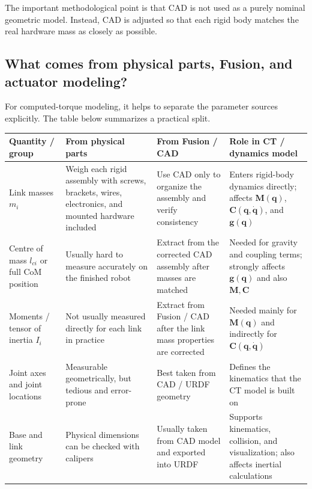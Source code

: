 \documentclass[11pt,a4paper]{article}
\newcommand{\bq}{\bm{q}}
\newcommand{\bM}{\bm{M}}
\newcommand{\bC}{\bm{C}}
\newcommand{\bG}{\bm{g}}
\begin{document}
The important methodological point is that CAD is not used as a purely nominal
geometric model.  Instead, CAD is adjusted so that each rigid body matches the
real hardware mass as closely as possible.

\subsection{What comes from physical parts, Fusion, and actuator modeling?}

For computed-torque modeling, it helps to separate the parameter sources
explicitly.  The table below summarizes a practical split.

\begin{table}[H]
\centering
\small
\begin{tabularx}{\linewidth}{p{3.0cm} p{3.2cm} p{3.2cm} X}
\toprule
\textbf{Quantity / group} & \textbf{From physical parts} & \textbf{From Fusion / CAD} & \textbf{Role in CT / dynamics model} \\
\midrule
Link masses $m_i$ & Weigh each rigid assembly with screws, brackets, wires, electronics, and mounted hardware included & Use CAD only to organize the assembly and verify consistency & Enters rigid-body dynamics directly; affects $\bM(\bq)$, $\bC(\bq,\dot{\bq})$, and $\bG(\bq)$ \\

Centre of mass $l_{ci}$ or full CoM position & Usually hard to measure accurately on the finished robot & Extract from the corrected CAD assembly after masses are matched & Needed for gravity and coupling terms; strongly affects $\bG(\bq)$ and also $\bM,\bC$ \\

Moments / tensor of inertia $I_i$ & Not usually measured directly for each link in practice & Extract from Fusion / CAD after the link mass properties are corrected & Needed mainly for $\bM(\bq)$ and indirectly for $\bC(\bq,\dot{\bq})$ \\

Joint axes and joint locations & Measurable geometrically, but tedious and error-prone & Best taken from CAD / URDF geometry & Defines the kinematics that the CT model is built on \\

Base and link geometry & Physical dimensions can be checked with calipers & Usually taken from CAD model and exported into URDF & Supports kinematics, collision, and visualization; also affects inertial calculations \\


\end{tabularx}
\end{table}
\end{document}
